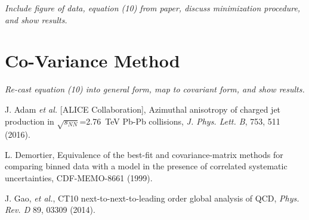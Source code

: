 \documentclass[11pt]{article}
\begin{document}
{\it Include figure of data, equation (10) from paper, discuss minimization procedure, and show results.}

\section{Co-Variance Method}

{\it Re-cast equation (10) into general form, map to covariant form, and show results.}


\begin{thebibliography}{10}

 J. Adam {\it et al.} [ALICE Collaboration], Azimuthal anisotropy of charged jet production in $\sqrt{s_{NN}}$=2.76~TeV Pb-Pb collisions, {\it J. Phys. Lett. B}, 753, 511 (2016).

 L. Demortier, Equivalence of the best-fit and covariance-matrix methods for comparing binned data with a model in the presence of correlated systematic uncertainties, CDF-MEMO-8661 (1999).

 J. Gao, {\it et al.}, CT10 next-to-next-to-leading order global analysis of QCD, {\it Phys. Rev. D} 89, 03309 (2014).

\end{thebibliography}
\end{document}
